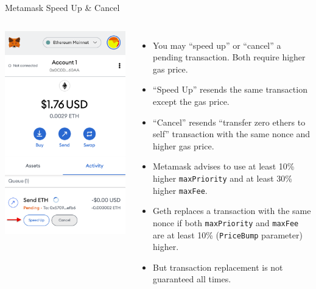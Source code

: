\begin{frame}[fragile]{Metamask Speed Up \& Cancel}
  \begin{columns}
\includegraphics[width=1.25\linewidth]{metamask_speedup_cancel} 
\begin{itemize}
  \item You may ``speed up'' or ``cancel'' a pending transaction. Both require higher gas price.
  \item ``Speed Up'' resends the same transaction except the gas price.
  \item ``Cancel'' resends ``transfer zero ethers to self'' transaction with the same nonce and higher gas price.
  \item Metamask advises to use at least 10\% higher \texttt{maxPriority} and at least 30\% higher \texttt{maxFee}.
  \item Geth replaces a transaction with the same nonce if both \texttt{maxPriority} and \texttt{maxFee} are at least 10\% (\texttt{PriceBump} parameter) higher.
  \item But transaction replacement is not guaranteed all times.
\end{itemize}
  \end{columns}
\end{frame}
